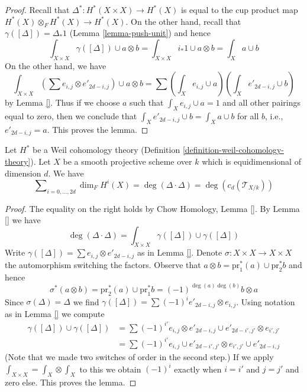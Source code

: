 \begin{proof}
Recall that $\Delta^* : H^*(X \times X) \to H^*(X)$ is equal to the
cup product map $H^*(X) \otimes_F H^*(X) \to H^*(X)$. On the other
hand, recall that $\gamma([\Delta]) = \Delta_*1$ (Lemma \ref{lemma-push-unit})
and hence
$$
\int_{X \times X} \gamma([\Delta]) \cup a \otimes b =
\int_{X \times X} i_*1 \cup a \otimes b =
\int_X a \cup b
$$
On the other hand, we have
$$
\int_{X \times X} (\sum e_{i, j} \otimes e'_{2d -i , j}) \cup a \otimes b =
\sum (\int_X e_{i, j} \cup a)(\int_X e'_{2d - i, j} \cup b)
$$
by Lemma \ref{}. Thus if we choose $a$ such that $\int_X e_{i, j} \cup a = 1$
and all other pairings equal to zero, then we conclude that
$\int_X e'_{2d - i, j} \cup b = \int_X a \cup b$ for all $b$, i.e.,
$e'_{2d - i, j} = a$. This proves the lemma.
\end{proof}

\begin{lemma}
\label{lemma-square-diagonal}
Let $H^*$ be a Weil cohomology theory
(Definition \ref{definition-weil-cohomology-theory}).
Let $X$ be a smooth projective scheme over $k$ which is equidimensional
of dimension $d$. We have
$$
\sum\nolimits_{i = 0, \ldots, 2d} \dim_F H^i(X) =
\deg(\Delta \cdot \Delta) = \deg(c_d(\mathcal{T}_{X/k}))
$$
\end{lemma}

\begin{proof}
The equality on the right holds by Chow Homology, Lemma \ref{}.
By Lemma \ref{} we have
$$
\deg(\Delta \cdot \Delta) =
\int_{X \times X} \gamma([\Delta]) \cup \gamma([\Delta])
$$
Write $\gamma([\Delta]) = \sum  e_{i, j} \otimes e'_{2d - i , j}$
as in Lemma \ref{}.
Denote $\sigma : X \times X \to X \times X$ the automorphism switching
the factors. Observe that $a \otimes b = \text{pr}_1^*(a) \cup \text{pr}_2^*b$
and hence
$$
\sigma^*(a \otimes b) =  \text{pr}_2^*(a) \cup \text{pr}_1^*b =
(-1)^{\deg(a)\deg(b)} b \otimes a
$$
Since $\sigma(\Delta) = \Delta$ we find
$\gamma([\Delta]) = \sum (-1)^i e'_{2d - i , j} \otimes e_{i, j}$.
Using notation as in Lemma \ref{} we compute
\begin{align*}
\gamma([\Delta]) \cup \gamma([\Delta])
& =
\sum (-1)^{i'}
e_{i, j} \otimes e'_{2d - i , j} \cup e'_{2d - i', j'} \otimes e_{i', j'} \\
& =
\sum (-1)^{i'} e_{i, j} \cup e'_{2d - i', j'} \otimes 
e_{i', j'} \cup e'_{2d - i , j}
\end{align*}
(Note that we made two switches of order in the second step.)
If we apply $\int_{X \times X} = \int_X \otimes \int_X$ to this
we obtain $(-1)^i$ exactly when $i = i'$ and $j = j'$ and zero else.
This proves the lemma.
\end{proof}

